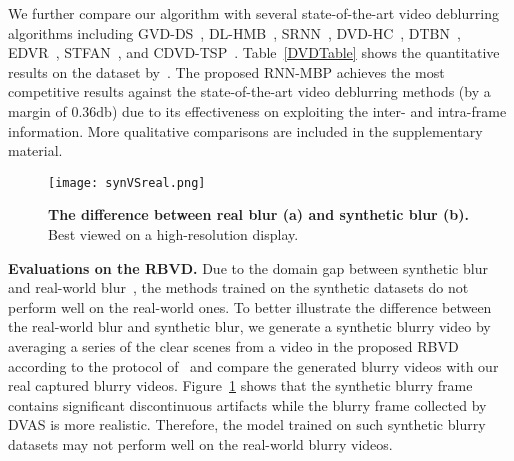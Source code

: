 \documentclass[letterpaper]{article} \usepackage{aaai22}  \usepackage{times}  \usepackage{helvet}  \usepackage{courier}  \usepackage[hyphens]{url}  \usepackage{graphicx} \urlstyle{rm} \def\UrlFont{\rm}  \usepackage{natbib}  \usepackage{caption} \DeclareCaptionStyle{ruled}{labelfont=normalfont,labelsep=colon,strut=off} \frenchspacing  \setlength{\pdfpagewidth}{8.5in}  \setlength{\pdfpageheight}{11in}  \newcommand{\hang}{\textcolor[rgb]{0.98,0.5,0.04}}
\begin{document}
We further compare our algorithm with several state-of-the-art video deblurring algorithms including GVD-DS~\cite{7299181}, DL-HMB~\cite{8099888}, SRNN~\cite{8578951},  DVD-HC~\cite{Su_2017_CVPR}, DTBN~\cite{Kim_2017_ICCV}, EDVR~\cite{2019EDVR}, STFAN~\cite{9010007}, and CDVD-TSP~\cite{Pan_2020_CVPR}.    
Table~\ref{DVDTable} shows the quantitative results on the dataset by~\cite{Su_2017_CVPR}.
The proposed RNN-MBP achieves the most competitive results against the state-of-the-art video deblurring methods (by a margin of 0.36db) due to its effectiveness on exploiting the inter- and intra-frame information. 
More qualitative comparisons are included in the supplementary material. 
\begin{figure}[!t] 
  \centering
  \texttt{[image: synVSreal.png]}
    \vspace{-3mm}
  \caption{\textbf{The difference between real blur (a) and synthetic blur (b).} Best viewed on a high-resolution display.}
\label{fig:synVSreal}
\vspace{-2mm}
\end{figure}


{ \bf Evaluations on the RBVD.} Due to the domain gap between synthetic blur and real-world blur~\cite{8953368}, the methods trained on the synthetic datasets do not perform well on the real-world ones.
To better illustrate the difference between the real-world blur and synthetic blur, we generate a synthetic blurry video by averaging a series of the clear scenes from a video in the proposed RBVD according to the protocol of~\cite{deepdeblur} and compare the generated blurry videos with our real captured blurry videos.
Figure~\ref{fig:synVSreal} shows that the synthetic blurry frame contains significant discontinuous artifacts while the blurry frame collected by DVAS is more realistic. 
Therefore, the model trained on such synthetic blurry datasets may not perform well on the real-world blurry videos. 
\end{document}
